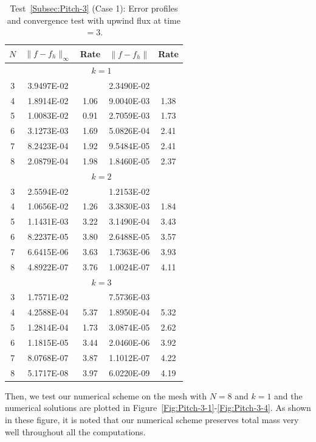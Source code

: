 \documentclass[preprint,11pt]{elsarticle}
\begin{document}
\begin{table}[H]
\caption{Test~\ref{Subsec:Pitch-3} (Case 1): Error profiles and convergence test with upwind flux at time$=3$.}\label{Tab:pitch_rad}
\centering
\begin{tabular}{c|cc|cc}	\hline\hline
$N$ & $\|f-f_h\|_{\infty}$ & Rate & $\|f-f_h\|$ & Rate \\ \hline		
&\multicolumn{4}{c}{$k=1$}\\ \hline
3	&3.9497E-02	&	&2.3490E-02	& \\
4	&1.8914E-02	&1.06	&9.0040E-03	&1.38\\
5	&1.0083E-02	&0.91	&2.7059E-03	&1.73\\
6	&3.1273E-03	&1.69	&5.0826E-04	&2.41\\
7	&8.2423E-04	&1.92	&9.5484E-05	&2.41\\
8	&2.0879E-04	&1.98	&1.8460E-05	&2.37\\ \hline
	&\multicolumn{4}{c}{$k=2$}\\ \hline			
3	&2.5594E-02	&	&1.2153E-02	& \\
4	&1.0656E-02	&1.26	&3.3830E-03	&1.84\\
5	&1.1431E-03	&3.22	&3.1490E-04	&3.43\\
6	&8.2237E-05	&3.80	&2.6488E-05	&3.57\\
7	&6.6415E-06	&3.63	&1.7363E-06	&3.93\\
8	&4.8922E-07	&3.76	&1.0024E-07	&4.11\\ \hline
		&\multicolumn{4}{c}{$k=3$}\\ \hline		
3	&1.7571E-02	&	&7.5736E-03	& \\
4	&4.2588E-04	&5.37	&1.8950E-04	&5.32\\
5	&1.2814E-04	&1.73	&3.0874E-05	&2.62\\
6	&1.1815E-05	&3.44	&2.0460E-06	&3.92\\
7	&8.0768E-07	&3.87	&1.1012E-07	&4.22\\
8	&5.1717E-08	&3.97	&6.0220E-09	&4.19\\ \hline\hline
\end{tabular}
\end{table}

Then, we test our numerical scheme on the mesh with $N=8$ and $k=1$ and the numerical solutions are plotted in Figure~\ref{Fig:Pitch-3-1}-\ref{Fig:Pitch-3-4}. As shown in these figure, it is noted that our numerical scheme preserves total mass very well throughout all the computations.
\end{document}
